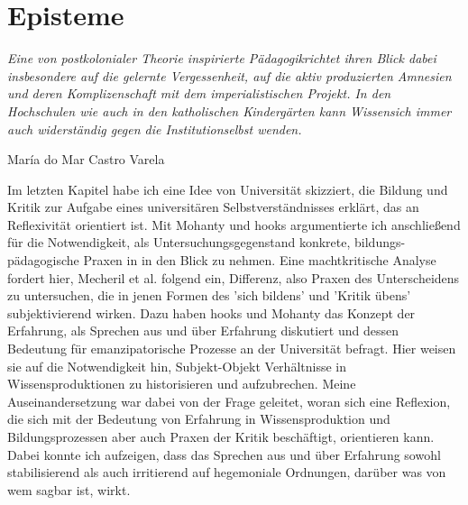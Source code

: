 \section{Episteme} \epigraph{\textit{ Eine von postkolonialer Theorie
inspirierte \glqq Pädagogik\grqq richtet ihren Blick dabei insbesondere auf die
gelernte Vergessenheit, auf die aktiv produzierten Amnesien und deren
Komplizenschaft mit dem imperialistischen Projekt. In den Hochschulen wie auch
in den katholischen Kindergärten kann \glqq Wissen\grqq sich immer auch
widerständig gegen die \glqq Institution\grqq selbst wenden. }}{María do Mar
Castro Varela \footnotemark}  

Im letzten Kapitel habe ich eine Idee von Universität skizziert,
die Bildung und Kritik zur Aufgabe eines universitären Selbstverständnisses
erklärt, das an Reflexivität orientiert ist. Mit Mohanty und hooks argumentierte
ich anschließend für die Notwendigkeit, als Untersuchungsgegenstand konkrete,
bildungs-pädagogische Praxen in in den Blick zu nehmen. Eine machtkritische
Analyse fordert hier, Mecheril et al. folgend ein, Differenz, also Praxen des
Unterscheidens zu untersuchen, die in jenen Formen des 'sich bildens' und
'Kritik übens' subjektivierend wirken. Dazu haben hooks und Mohanty das Konzept
der Erfahrung, als Sprechen aus und über Erfahrung diskutiert und dessen
Bedeutung für emanzipatorische Prozesse an der Universität befragt. Hier weisen
sie auf die Notwendigkeit hin, Subjekt-Objekt Verhältnisse in
Wissensproduktionen zu historisieren und aufzubrechen.
Meine Auseinandersetzung
war dabei von der Frage geleitet, woran sich eine Reflexion, die sich mit der
Bedeutung von Erfahrung in Wissensproduktion und Bildungsprozessen aber auch
Praxen der Kritik beschäftigt, orientieren kann. Dabei konnte ich aufzeigen,
dass das Sprechen aus und über Erfahrung sowohl stabilisierend als auch
irritierend auf hegemoniale Ordnungen, darüber was von wem sagbar ist, wirkt.

